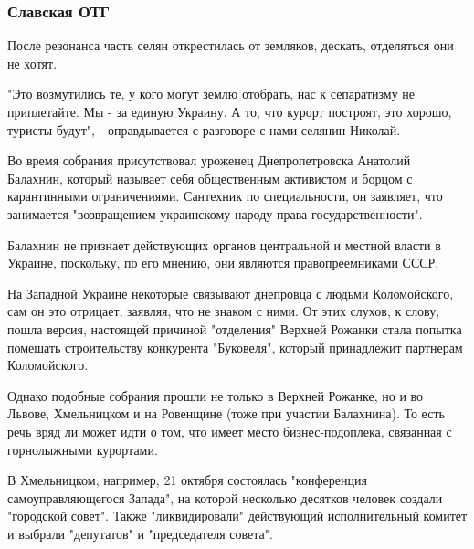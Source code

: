  
 
 
 
 

\subsubsection{Славская ОТГ}
\label{sec:22_12_2020.news.ua.strana.sibircev_aleksandr.1.ukraina_respublika.slavskaja_otg}

После резонанса часть селян открестилась от земляков, дескать, отделяться
они не хотят.

"Это возмутились те, у кого могут землю отобрать, нас к сепаратизму не
приплетайте. Мы - за единую Украину. А то, что курорт построят, это
хорошо, туристы будут", - оправдывается с разговоре с нами селянин
Николай.     

Во время собрания присутствовал уроженец Днепропетровска Анатолий
Балахнин, который называет себя общественным активистом и борцом с
карантинными ограничениями. Сантехник по специальности, он заявляет, что
занимается "возвращением украинскому народу права государственности".

Балахнин не признает действующих органов центральной и местной власти в
Украине, поскольку, по его мнению, они являются правопреемниками СССР.

На Западной Украине некоторые связывают днепровца с людьми Коломойского,
сам он это отрицает, заявляя, что не знаком с ними. От этих слухов, к
слову, пошла версия, настоящей причиной "отделения" Верхней Рожанки стала
попытка помешать строительству конкурента "Буковеля", который принадлежит
партнерам Коломойского.

Однако подобные собрания прошли не только в Верхней Рожанке, но и во
Львове, Хмельницком и на Ровенщине (тоже при участии Балахнина). То есть
речь вряд ли может идти о том, что имеет место бизнес-подоплека, связанная
с горнолыжными курортами.

В Хмельницком, например, 21 октября состоялась "конференция
самоуправляющегося Запада", на которой несколько десятков человек создали
"городской совет". Также "ликвидировали" действующий исполнительный
комитет и выбрали "депутатов" и "председателя совета".

